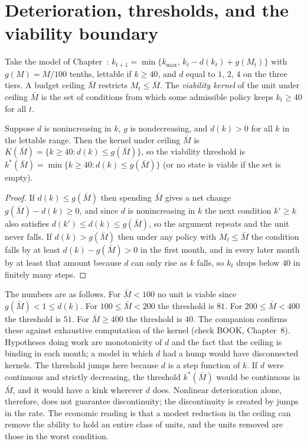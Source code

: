 \section{Deterioration, thresholds, and the viability boundary}

Take the model of Chapter~: $k_{t+1}=\min\{k_{\max},\,k_t-d(k_t)+g(M_t)\}$ with $g(M)=M/100$ tenths, lettable if $k\ge 40$, and $d$ equal to $1$, $2$, $4$ on the three tiers. A budget ceiling $\bar M$ restricts $M_t\le\bar M$. The \emph{viability kernel} of the unit under ceiling $\bar M$ is the set of conditions from which some admissible policy keeps $k_t\ge 40$ for all $t$.

\begin{theorem}\label{thm:P12b}
Suppose $d$ is nonincreasing in $k$, $g$ is nondecreasing, and $d(k)>0$ for all $k$ in the lettable range. Then the kernel under ceiling $\bar M$ is $K(\bar M)=\{k\ge 40: d(k)\le g(\bar M)\}$, so the viability threshold is $k^*(\bar M)=\min\{k\ge 40: d(k)\le g(\bar M)\}$ (or no state is viable if the set is empty).
\end{theorem}

\begin{proof}
If $d(k)\le g(\bar M)$ then spending $\bar M$ gives a net change $g(\bar M)-d(k)\ge 0$, and since $d$ is nonincreasing in $k$ the next condition $k'\ge k$ also satisfies $d(k')\le d(k)\le g(\bar M)$, so the argument repeats and the unit never falls. If $d(k)>g(\bar M)$ then under any policy with $M_t\le\bar M$ the condition falls by at least $d(k)-g(\bar M)>0$ in the first month, and in every later month by at least that amount because $d$ can only rise as $k$ falls, so $k_t$ drops below $40$ in finitely many steps.
\end{proof}

The numbers are as follows. For $\bar M<100$ no unit is viable since $g(\bar M)<1\le d(k)$. For $100\le\bar M<200$ the threshold is $81$. For $200\le\bar M<400$ the threshold is $51$. For $\bar M\ge 400$ the threshold is $40$. The companion confirms these against exhaustive computation of the kernel (check BOOK, Chapter~8). Hypotheses doing work are monotonicity of $d$ and the fact that the ceiling is binding in each month; a model in which $d$ had a hump would have disconnected kernels. The threshold jumps here because $d$ is a step function of $k$. If $d$ were continuous and strictly decreasing, the threshold $k^*(\bar M)$ would be continuous in $\bar M$, and it would have a kink wherever $d$ does. Nonlinear deterioration alone, therefore, does not guarantee discontinuity; the discontinuity is created by jumps in the rate. The economic reading is that a modest reduction in the ceiling can remove the ability to hold an entire class of units, and the units removed are those in the worst condition.

